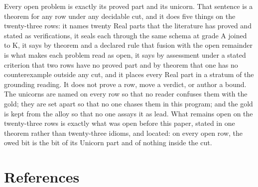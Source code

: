 \documentclass[10pt,twocolumn]{article}
\begin{document}
Every open problem is exactly its proved part and its unicorn. That
sentence is a theorem for any row under any decidable cut, and it does
five things on the twenty-three rows: it names twenty Real parts that
the literature has proved and stated as verifications, it seals each
through the same schema at grade A joined to K, it says by theorem and a
declared rule that fusion with the open remainder is what makes each
problem read as open, it says by assessment under a stated criterion
that two rows have no proved part and by theorem that one has no
counterexample outside any cut, and it places every Real part in a
stratum of the grounding reading. It does not prove a row, move a
verdict, or author a bound. The unicorns are named on every row so that
no reader confuses them with the gold; they are set apart so that no one
chases them in this program; and the gold is kept from the alloy so that
no one assays it as lead. What remains open on the twenty-three rows is
exactly what was open before this paper, stated in one theorem rather
than twenty-three idioms, and located: on every open row, the owed bit
is the bit of its Unicorn part and of nothing inside the cut.

\hypertarget{references}{%
\section{References}\label{references}}
\end{document}
